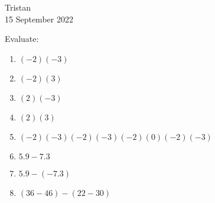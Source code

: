 \documentclass[14pt]{extarticle} %
\begin{document}
\hfill Tristan\\
\null\hfill 15 September 2022

\vspace{10mm}

Evaluate:
\begin{enumerate}[label=\Alph*.), itemsep=\fill]
\item  $(-2)(-3)$
\item  $(-2)(3)$
\item  $(2)(-3)$
\item  $(2)(3)$
\item  $(-2)(-3)(-2)(-3)(-2)(0)(-2)(-3)$
\vfill\clearpage
\item $5.9-7.3$
\item $5.9-(-7.3)$
\item $(36-46)-(22-30)$
\vfill\end{enumerate}
\end{document}
